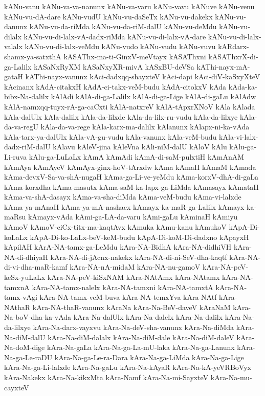{kANu-vanu
kANu-va-va-nanunx
kANu-va-varu
kANu-vavu
kANuve
kANu-venu
kANu-vu-dA-dare
kANu-vudU
kANu-vu-daSeTx
kANu-vu-dakekx
kANu-vu-danunx
kANu-vu-da-riMda
kANu-vu-da-riM-dalU
kANu-vu-deMdu
kANu-vu-dilalx
kANu-vu-di-lalx-vA-dadx-riMda
kANu-vu-di-lalx-vA-dare
kANu-vu-di-lalx-valalx
kANu-vu-di-lalx-veMdu
kANu-vudo
kANu-vudu
kANu-vuvu
kARdarx-shamx-ya-satxthA
kASAThx-ma-ti-GinxV-meVtayx
kASAThxni
kASAThxrX-di-ga-Lalilx
kASaNxRyXM
kASaNxyXR-mivA
kASxBU-deVSa
kAThi-nayx-mA-gataH
kAThi-nayx-vanunx
kAci-dadxqq-shayxteV
kAci-dapi
kAci-diV-kaSxyXteV
kAcinanx
kAdA-citakxH
kAdA-ci-takx-veM-budu
kAdA-citokxV
kAda
kAda-ka-bibx-Na-dalilx
kAlAdi
kAlA-di-ga-Lalilx
kAlA-di-ga-Lige
kAlA-di-gaLu
kAlAdw
kAlA-namxqq-tuyx-rA-ga-caCxti
kAlA-natxreV
kAlA-tApxrXNoV
kAla
kAlada
kAla-dalUlx
kAla-dalilx
kAla-da-lilxde
kAla-da-lilx-ru-vudu
kAla-da-lilxye
kAla-da-va-regU
kAla-da-va-rege
kAla-karx-ma-dalilx
kAlanunx
kAlapx-ni-ka-vAda
kAla-tarx-ya-dalUlx
kAla-vA-gu-vudu
kAla-vanunx
kAla-veM-budu
kAla-vi-lalx-dadx-riM-dalU
kAlavu
kAleV-jina
kAleVna
kAli-niM-dalU
kAloV
kAlu
kAlu-ga-Li-ruva
kAlu-ga-LuLaLx
kAmA
kAmAdi
kAmA-di-saM-pulxtiH
kAmAnAM
kAmAya
kAmAyeV
kAmAyx-ginx-hoV-tArxdw
kAma
kAmaH
kAmaM
kAmada
kAma-devxV-Sa-va-shA-nugaH
kAma-ga-Li-ve-yeMdu
kAma-korxV-dhA-di-gaLa
kAma-korxdha
kAma-masutx
kAma-saM-ka-lapx-ga-LiMda
kAmasayx
kAmataH
kAma-va-shA-dasayx
kAma-va-sha-diMda
kAma-veM-budu
kAma-vi-lalxde
kAma-ya-mAnaH
kAma-ya-mA-nashacx
kAmayx-ka-maR-ga-Lalilx
kAmayx-ka-maRsu
kAmayx-vAda
kAmi-ga-LA-da-varu
kAmi-gaLu
kAminaH
kAmiyu
kAmoV
kAmoV-ciCx-titx-ma-kaqtAvx
kAmuka
kAmu-kanu
kAmukoV
kApA-Di-koLaLx
kApA-Di-ko-LaLx-beV-keM-budu
kApA-Di-koM-Di-dadxno
kApayxH
kApilAH
kArA-NA-tamx-ga-LeMdu
kAra-NA-BidhA
kAra-NA-didhiVH
kAra-NA-di-dhiyaH
kAra-NA-di-jAcnx-nakekx
kAra-NA-di-ni-SeV-dha-kaqtf
kAra-NA-di-vi-dha-maR-kamf
kAra-NA-nA-midaM
kAra-NA-nu-gamoV
kAra-NA-peV-keSx-yuLaLx
kAra-NA-peV-kiSxNAM
kAra-NAtAmx
kAra-NAtamx
kAra-NA-tamxnA
kAra-NA-tamx-nalelx
kAra-NA-tamxni
kAra-NA-tamxtA
kAra-NA-tamx-vAgi
kAra-NA-tamx-veM-buva
kAra-NA-temxYva
kAra-NAtf
kAra-NAthaR
kAra-NA-thaR-vanunx
kAraNa
kAra-Na-BeV-daveV
kAraNaM
kAra-Na-boV-dha-ka-vAda
kAra-Na-dalUlx
kAra-Na-dalelx
kAra-Na-dalilx
kAra-Na-da-lilxye
kAra-Na-darx-vayxvu
kAra-Na-deV-sha-vanunx
kAra-Na-diMda
kAra-Na-diM-dalU
kAra-Na-diM-dalalx
kAra-Na-diM-dale
kAra-Na-diM-daleV
kAra-Na-doM-dige
kAra-Na-gaLa
kAra-Na-ga-La-mU-laka
kAra-Na-ga-Lanunx
kAra-Na-ga-Le-raDU
kAra-Na-ga-Le-ra-Dara
kAra-Na-ga-LiMda
kAra-Na-ga-Lige
kAra-Na-ga-Li-lalxde
kAra-Na-gaLu
kAra-Na-kAyaR
kAra-Na-kA-yeVRBoVyx
kAra-Nakekx
kAra-Na-kikxMta
kAra-Namf
kAra-Na-mi-SayxteV
kAra-Na-mu-cayxteV
}
